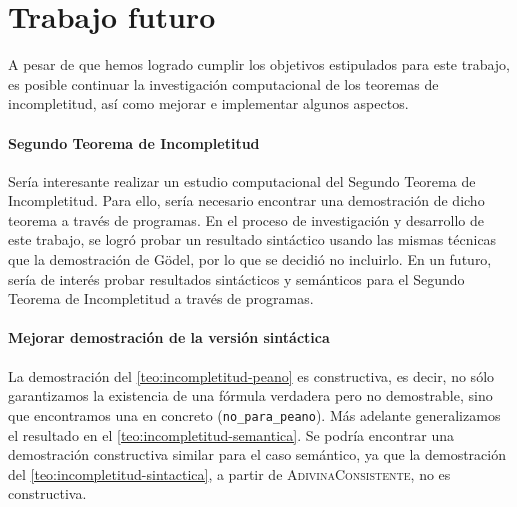 
\vspace{28pt}

\chapter{Trabajo futuro}\label{ch:trabajo-futuro}

A pesar de que hemos logrado cumplir los objetivos estipulados para este trabajo, es posible continuar la investigación computacional de los teoremas de incompletitud, así como mejorar e implementar algunos aspectos.

\subsubsection*{Segundo Teorema de Incompletitud}

Sería interesante realizar un estudio computacional del Segundo Teorema de Incompletitud. Para ello, sería necesario encontrar una demostración de dicho teorema a través de programas. En el proceso de investigación y desarrollo de este trabajo, se logró probar un resultado sintáctico usando las mismas técnicas que la demostración de Gödel, por lo que se decidió no incluirlo. En un futuro, sería de interés probar resultados sintácticos y semánticos para el Segundo Teorema de Incompletitud a través de programas.

\subsubsection*{Mejorar demostración de la versión sintáctica}

La demostración del \cref{teo:incompletitud-peano} es constructiva, es decir, no sólo garantizamos la existencia de una fórmula verdadera pero no demostrable, sino que encontramos una en concreto (\texttt{no\_para\_peano}). Más adelante generalizamos el resultado en el \cref{teo:incompletitud-semantica}. Se podría encontrar una demostración constructiva similar para el caso semántico, ya que la demostración del \cref{teo:incompletitud-sintactica}, a partir de \textsc{AdivinaConsistente}, no es constructiva.

